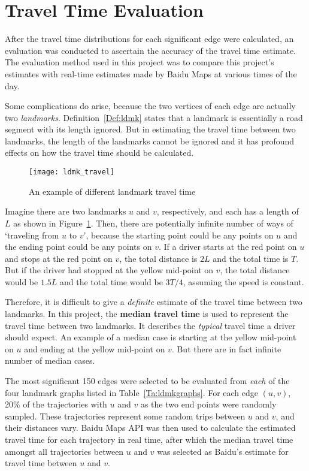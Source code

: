 \section{Travel Time Evaluation}
After the travel time distributions for each significant edge were calculated, an evaluation was conducted to ascertain the accuracy of the travel time estimate. The evaluation method used in this project was to compare this project's estimates with real-time estimates made by Baidu Maps at various times of the day. 

Some complications do arise, because the two vertices of each edge are actually two \emph{landmarks}. Definition~\ref{Def:ldmk} states that a landmark is essentially a road segment with its length ignored. But in estimating the travel time between two landmarks, the length of the landmarks cannot be ignored and it has profound effects on how the travel time should be calculated. 

\begin{figure}[h!]
\texttt{[image: ldmk\_travel]}
\centering
\caption{An example of different landmark travel time}\label{Fig:ldmk_travel}
\end{figure}

Imagine there are two landmarks $u$ and $v$, respectively, and each has a length of $L$ as shown in Figure~\ref{Fig:ldmk_travel}. Then, there are potentially infinite number of ways of `traveling from $u$ to $v$', because the starting point could be any points on $u$ and the ending point could be any points on $v$. If a driver starts at the red point on $u$ and stops at the red point on $v$, the total distance is $2L$ and the total time is $T$. But if the driver had stopped at the yellow mid-point on $v$, the total distance would be $1.5L$ and the total time would be $3T/4$, assuming the speed is constant. 

Therefore, it is difficult to give a \emph{definite} estimate of the travel time between two landmarks. In this project, the \textbf{median travel time} is used to represent the travel time between two landmarks. It describes the \emph{typical} travel time a driver should expect. An example of a median case is starting at the yellow mid-point on $u$ and ending at the yellow mid-point on $v$. But there are in fact infinite number of median cases. 

The most significant 150 edges were selected to be evaluated from \emph{each} of the four landmark graphs listed in Table~\ref{Ta:ldmkgraphs}. For each edge $(u, v)$, 20\% of the trajectories with $u$ and $v$ as the two end points were randomly sampled. These trajectories represent some random trips between $u$ and $v$, and their distances vary. Baidu Maps API was then used to calculate the estimated travel time for each trajectory in real time, after which the median travel time amongst all trajectories between $u$ and $v$ was selected as Baidu's estimate for travel time between $u$ and $v$. 